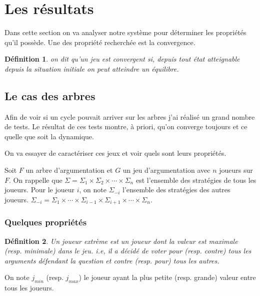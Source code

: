 \documentclass[11pt]{article}
\theoremstyle{defi}
\newtheorem{definition}{Définition}[section]
\theoremstyle{not}
\theoremstyle{prob}
\begin{document}
  \section{Les résultats}
    Dans cette section on va analyser notre système pour déterminer les propriétés qu'il possède.
    Une des propriété recherchée est la convergence.

    \begin{definition}
      on dit qu'un jeu est convergent si, depuis tout état atteignable depuis la situation initiale on peut atteindre un équilibre.
    \end{definition}

    \subsection{Le cas des arbres}
      Afin de voir si un cycle pouvait arriver sur les arbres j'ai réalisé un grand nombre de tests.
      Le résultat de ces tests montre, à priori, qu'on converge toujours et ce quelle que soit la dynamique.

      On va essayer de caractériser ces jeux et voir quels sont leurs propriétés.

      Soit $F$ un arbre d'argumentation et $G$ un jeu d'argumentation avec $n$ joueurs sur $F$.
      On rappelle que $\Sigma = \Sigma_1 \times \Sigma_2 \times \cdots \times \Sigma_n$ est l'ensemble des stratégies de tous les joueurs.
      Pour le joueur $i$, on note $\Sigma_{-i}$ l'ensemble des stratégies des autres joueurs. $\Sigma_{-i} = \Sigma_1 \times \cdots \times \Sigma_{i-1} \times \Sigma_{i+1} \times \cdots \times \Sigma_n$.

      \subsubsection{Quelques propriétés}
        \begin{definition}
          Un joueur extrème est un joueur dont la valeur est maximale (resp. minimale) dans le jeu. i.e, il a décidé de voter pour (resp. contre) tous les arguments défendant la question et contre (resp. pour) tous les autres.
        \end{definition}

        On note $j_{min}$ (resp. $j_{max}$) le joueur ayant la plus petite (resp. grande) valeur entre tous les joueurs.
\end{document}
